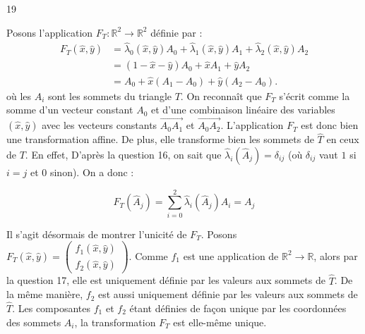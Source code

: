 
\begin{reponse}{19}

Posons l'application $F_T : \mathbb{R}^2 \to \mathbb{R}^2$ définie par :
\begin{align*}
    F_T(\hat{x}, \hat{y}) & = \hat{\lambda}_0(\hat{x}, \hat{y}) A_0 + \hat{\lambda}_1(\hat{x}, \hat{y}) A_1 + \hat{\lambda}_2(\hat{x}, \hat{y}) A_2 \\
    & = (1 - \hat{x} - \hat{y}) A_0 + \hat{x} A_1 + \hat{y} A_2 \\ 
    & = A_0 + \hat{x}(A_1 - A_0) + \hat{y}(A_2 - A_0).
\end{align*}
où les $A_i$ sont les sommets du triangle $T$. On reconnaît que $F_T$ s'écrit comme la somme d'un vecteur constant $A_0$ et d'une combinaison linéaire des variables $(\hat{x}, \hat{y})$ avec les vecteurs constants $\overset{\rightarrow}{A_0A_1}$ et $\overset{\rightarrow}{A_0A_2}$. L'application $F_T$ est donc bien une transformation affine. De plus, elle transforme bien les sommets de $\hat{T}$ en ceux de $T$. En effet, D'après la question 16, on sait que $\hat{\lambda}_i(\hat{A}_j) = \delta_{ij}$ (où $\delta_{ij}$ vaut $1$ si $i=j$ et $0$ sinon). On a donc :

\[
    F_T(\hat{A}_j) = \sum_{i=0}^2 \hat{\lambda}_i(\hat{A}_j) A_i = A_j
\]

Il s'agit désormais de montrer l'unicité de $F_T$. Posons $F_T(\hat{x}, \hat{y}) = \begin{pmatrix}
    f_1(\hat{x}, \hat{y}) \\ f_2(\hat{x}, \hat{y})
\end{pmatrix}$. Comme $f_1$ est une application de $\mathbb{R}^2 \longrightarrow \mathbb{R}$, alors par la question 17, elle est uniquement définie par les valeurs aux sommets de $\hat{T}$. De la même manière, $f_2$ est aussi uniquement définie par les valeurs aux sommets de $\hat{T}$. Les composantes $f_1$ et $f_2$ étant définies de façon unique par les coordonnées des sommets $A_i$, la transformation $F_T$ est elle-même unique.

\end{reponse}


